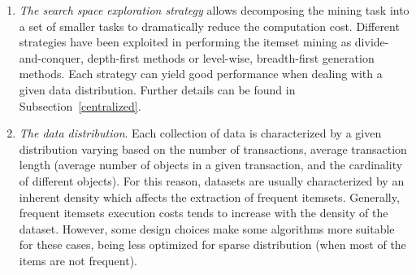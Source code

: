 \begin{enumerate}

\item \textit{The search space exploration strategy} allows decomposing the mining task into a set of smaller tasks to dramatically reduce the computation cost. Different strategies have been exploited in performing the itemset mining as divide-and-conquer, depth-first methods or level-wise, breadth-first generation methods.  Each strategy can yield good performance when dealing with a given data distribution. Further details can be found in Subsection~\ref{centralized}.

\item \textit{The data distribution}. 
Each collection of data is characterized by a given distribution varying based on the number of transactions, average transaction length (average number of objects in a given transaction, and the cardinality of different objects). For this reason, datasets are usually characterized by an inherent density which affects the extraction of frequent itemsets.
Generally, frequent itemsets execution costs tends to increase with the density of the dataset. However, some design choices make some algorithms more suitable for these cases, being less optimized for sparse distribution (when most of the items are not frequent).


 \end{enumerate}


